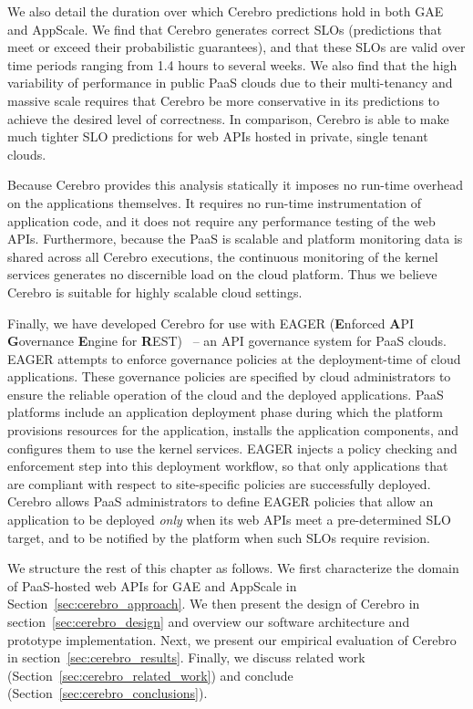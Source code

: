 We also detail the duration over which 
Cerebro predictions hold in both GAE and AppScale.  
We find that Cerebro generates correct SLOs (predictions that meet or exceed their
probabilistic guarantees), and that these SLOs are valid over time periods ranging
from 1.4 hours to several weeks.  
We also find that the high variability of performance in public PaaS clouds due to their multi-tenancy
and massive scale requires that Cerebro be more conservative in its predictions 
to achieve the desired level of correctness. In comparison, Cerebro is able to make
much tighter SLO predictions for web APIs hosted in private, single tenant clouds.

Because Cerebro provides this 
analysis statically it imposes no run-time overhead on the applications
themselves. It requires no run-time instrumentation of application code,
and it does not require any performance testing of the web APIs.
Furthermore, because the PaaS is scalable and platform monitoring data is 
shared across all Cerebro executions, the continuous monitoring of the
kernel services generates no discernible load on the cloud platform.
Thus we believe Cerebro is suitable for highly scalable cloud
settings.

Finally, we have developed Cerebro for use with EAGER (\textbf{E}nforced
\textbf{A}PI \textbf{G}overnance \textbf{E}ngine for
\textbf{R}EST)~\cite{eager-fop15} --
an API governance system for PaaS clouds. EAGER attempts to enforce
governance policies at the deployment-time of cloud applications. These governance
policies are specified by cloud administrators to ensure the reliable
operation of the cloud and the deployed applications. PaaS
platforms include an application deployment phase during which the platform provisions
resources for the application, installs the application components, and
configures them to use the kernel services. EAGER injects a policy checking and
enforcement step into this deployment workflow, so that only applications that
are compliant with respect to site-specific policies are successfully deployed. 
Cerebro allows
PaaS administrators to define
EAGER policies that allow an application to be deployed \textit{only} when its
web APIs meet a pre-determined SLO target, and to be
notified by the platform when such SLOs require revision.


We structure the rest of this chapter as follows.
We first characterize the domain of 
PaaS-hosted web APIs for GAE and AppScale 
in Section~\ref{sec:cerebro_approach}.   
We then present the design of Cerebro in section~\ref{sec:cerebro_design}
and overview our software architecture and prototype implementation.
Next, we
present our empirical evaluation of Cerebro in 
section~\ref{sec:cerebro_results}.
Finally,  we discuss related work (Section~\ref{sec:cerebro_related_work}) and 
conclude (Section~\ref{sec:cerebro_conclusions}).